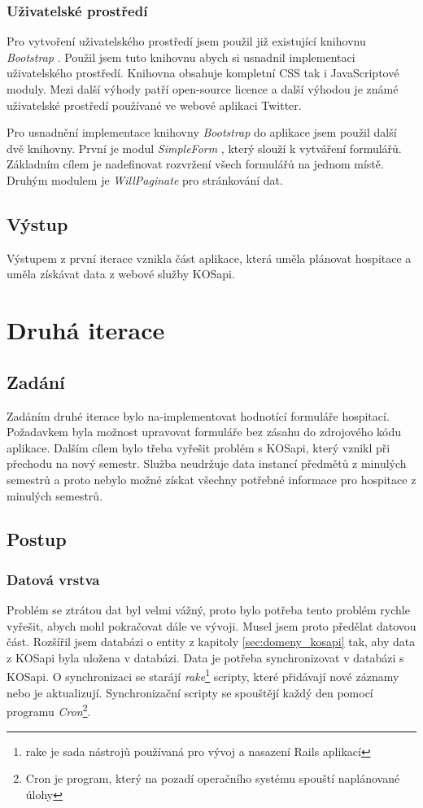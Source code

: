 \subsubsection{Uživatelské prostředí}
Pro vytvoření uživatelského prostředí jsem použil již existující knihovnu \textit{Bootstrap} \cite{bootstrap}. Použil jsem tuto knihovnu abych si usnadnil implementaci uživatelského prostředí. Knihovna obsahuje kompletní CSS tak i JavaScriptové moduly. Mezi další výhody patří open-source licence a další výhodou je známé uživatelské prostředí používané ve webové aplikaci Twitter.

Pro usnadnění implementace knihovny \textit{Bootstrap} do aplikace jsem použil další dvě knihovny. První je modul \textit{SimpleForm} \cite{simpleform}, který slouží k vytváření formulářů. Základním cílem je nadefinovat rozvržení všech formulářů na jednom místě. Druhým modulem je \textit{WillPaginate} \cite{willpaginate} pro stránkování dat.

\subsection{Výstup} 
Výstupem z první iterace vznikla část aplikace, která uměla plánovat hospitace a uměla získávat data z webové služby KOSapi.


\section{Druhá iterace}
\subsection{Zadání}
Zadáním druhé iterace bylo na-implementovat hodnotící formuláře hospitací. Požadavkem byla možnost upravovat formuláře bez zásahu do zdrojového kódu aplikace. Dalším cílem bylo třeba vyřešit problém s KOSapi, který vznikl při přechodu na nový semestr. Služba neudržuje data instancí předmětů z minulých semestrů a proto nebylo možné získat všechny potřebné informace pro hospitace z minulých semestrů.

\subsection{Postup}
\subsubsection{Datová vrstva}
Problém se ztrátou dat byl velmi vážný, proto bylo potřeba tento problém rychle vyřešit, abych mohl pokračovat dále ve vývoji. Musel jsem proto předělat datovou část. Rozšířil jsem databázi o entity z kapitoly \ref{sec:domeny_kosapi} tak, aby data z KOSapi byla uložena v databázi. Data je potřeba synchronizovat v databázi s KOSapi. O synchronizaci se starájí \textit{rake}\footnote{rake je sada nástrojů používaná pro vývoj a nasazení Rails aplikací} scripty, které přidávají nové záznamy nebo je aktualizují. Synchronizační scripty se spouštějí každý den pomocí programu \textit{Cron}\footnote{Cron je program, který na pozadí operačního systému spouští naplánované úlohy}.

